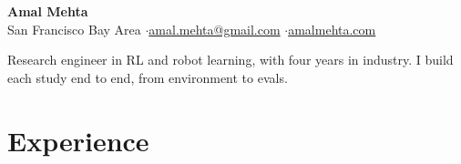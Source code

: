 \documentclass[10pt]{article}
\begin{document}
\fontsize{10.2}{12.2}\selectfont\raggedright

\begin{center}
{\LARGE\bfseries Amal Mehta}\\[3pt]
San Francisco Bay Area \quad$\cdot$\quad \href{mailto:amal.mehta@gmail.com}{amal.mehta@gmail.com} \quad$\cdot$\quad \href{https://amalmehta.com/}{amalmehta.com}
\end{center}

Research engineer in RL and robot learning, with four years in industry. I build each study end to end, from environment to evals.

\section*{Experience}
\end{document}
